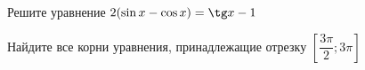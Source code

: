 \begin{ex}
	\begin{condition}
		\begin{enumcols}[label=\asbuk*)]
			\item Решите уравнение \( 2  (\sin x -\cos x)  = \tg x - 1 \)
			\item Найдите все корни уравнения, принадлежащие отрезку \( \left[\dfrac{3\pi}{2};3\pi\right] \)
		\end{enumcols}
	\end{condition}
\end{ex}
